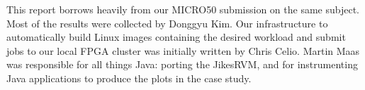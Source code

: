 This report borrows heavily from our MICRO50 submission on the same subject.
Most of the results were collected by Donggyu Kim. Our infrastructure to
automatically build Linux images containing the desired workload and submit
jobs to our local FPGA cluster was initially written by Chris Celio. Martin Maas
was responsible for all things Java: porting the JikesRVM, and for
instrumenting Java applications to produce the plots in the case study.



